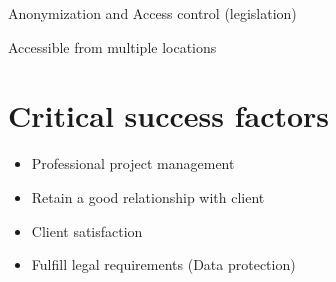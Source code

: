 \documentclass[a4paper]{scrreprt}
\begin{document}
Anonymization and Access control (legislation)


Accessible from multiple locations


\section*{Critical success factors}

\begin{itemize}
\item Professional project management
\item Retain a good relationship with client
\item Client satisfaction
\item Fulfill legal requirements (Data protection)
\end{itemize}
\end{document}
